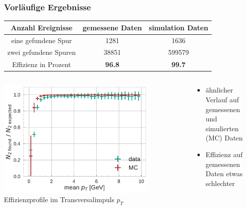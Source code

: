 \documentclass[18pt]{beamer}
\begin{document}
\begin{frame}
  \frametitle{Vorläufige Ergebnisse}
    \begin{tabular}{ccc}
      \toprule
    Anzahl Ereignisse & gemessene Daten &  simulation Daten\\
    \midrule
    eine gefundene Spur & 1281 & 1636 \\
    zwei gefundene Spuren &  38851 & 599579\\
      \midrule
      Effizienz in Prozent& \textbf{96.8} & \textbf{99.7} \\
      \bottomrule
  \end{tabular}
\begin{columns}
  \begin{column}{0.5\textwidth}
    \includegraphics[width=0.8\textwidth]{figures/efficiency_study/cosmicbased_findeff_over_pt.pdf}
    \scriptsize Effizienzprofile im Transversalimpuls $p_T$
    \end{column}
  \begin{column}{0.5\textwidth}
    \begin{itemize}
    \item ähnlicher Verlauf auf gemessenen und simulierten (MC) Daten
    \item Effizienz auf gemessenen Daten etwas schlechter
    \end{itemize}
  \end{column}
\end{columns}
\end{frame}

      
\end{document}
